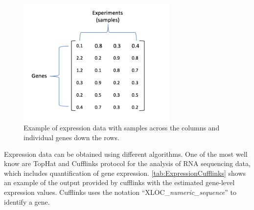 \documentclass[11pt, oneside]{article}   	%
\begin{document}
\begin{figure}[!h]
	\centering
	\includegraphics[width=0.7\textwidth]{example_expression_data}
	\caption{Example of expression data with samples across the columns and individual genes down the rows.}
	\label{fig:ExpressionData}
\end{figure}


Expression data can be obtained using different algorithms. One of the most well know are TopHat and Cufflinks protocol for the analysis of RNA sequencing data, which includes quantification of gene expression. \autoref{tab:ExpressionCufflinks} shows an example of the output provided by cufflinks with the estimated gene-level expression values. Cufflinks uses the notation ``XLOC\_{\it numeric\_sequence}'' to identify a gene.
\end{document}
